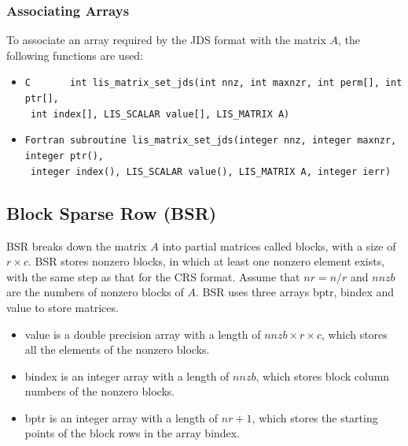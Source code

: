 \documentclass[a4paper]{article}
\begin{document}
\subsubsection{Associating Arrays}
To associate an array required by the JDS format with the matrix $A$, the following functions are used:
\begin{itemize}
\item \verb|C       int lis_matrix_set_jds(int nnz, int maxnzr, int perm[], int ptr[],|\\
      \verb| int index[], LIS_SCALAR value[], LIS_MATRIX A)|
\item \verb|Fortran subroutine lis_matrix_set_jds(integer nnz, integer maxnzr, integer ptr(),|\\
      \verb| integer index(), LIS_SCALAR value(), LIS_MATRIX A, integer ierr)|
\end{itemize}

\newpage
\subsection{Block Sparse Row (BSR)}
BSR breaks down the matrix $A$ into partial matrices called blocks, with a size of $r \times c$. 
BSR stores nonzero blocks, in which at least one nonzero element exists, with the same step as that for the CRS format. 
Assume that $nr=n/r$ and $nnzb$ are the numbers of nonzero blocks of $A$. 
BSR uses three arrays {\ttfamily bptr}, {\ttfamily bindex} and {\ttfamily value} to store matrices.
\begin{itemize}
\item {\ttfamily value} is a double precision array with a length of
      $nnzb \times r \times c$, which stores all the elements of the nonzero blocks.
\item {\ttfamily bindex} is an integer array with a length of $nnzb$,
      which stores block column numbers of the nonzero blocks.
\item {\ttfamily bptr} is an integer array with a length of $nr+1$,
      which stores the starting points of the block rows in the array {\ttfamily bindex}.
\end{itemize}
\end{document}
